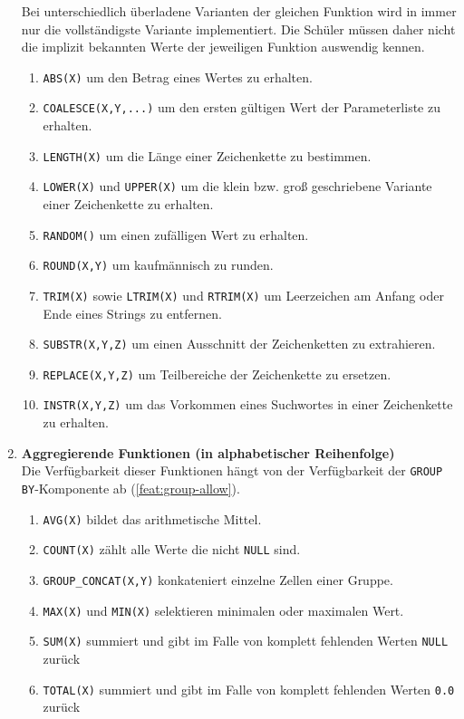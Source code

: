 \begin{enumerate}[resume]
  Bei unterschiedlich überladene Varianten der gleichen Funktion wird in \idename{} immer nur die vollständigste Variante implementiert. Die Schüler müssen daher nicht die implizit bekannten Werte der jeweiligen Funktion auswendig kennen.
  \begin{enumerate}[noitemsep]
  \item \label{feat:fun-abs} \texttt{ABS(X)} um den Betrag eines Wertes zu erhalten.
  \item \label{feat:fun-coalesce} \texttt{COALESCE(X,Y,...)} um den ersten gültigen Wert der Parameterliste zu erhalten.
  \item \label{feat:fun-length} \texttt{LENGTH(X)} um die Länge einer Zeichenkette zu bestimmen.
  \item \label{feat:fun-casing} \texttt{LOWER(X)} und \texttt{UPPER(X)} um die klein bzw. groß geschriebene Variante einer Zeichenkette zu erhalten.
  \item \label{feat:fun-random} \texttt{RANDOM()} um einen zufälligen Wert zu erhalten.
  \item \label{feat:fun-round} \texttt{ROUND(X,Y)} um kaufmännisch zu runden.
  \item \label{feat:fun-trim} \texttt{TRIM(X)} sowie \texttt{LTRIM(X)} und \texttt{RTRIM(X)} um Leerzeichen am Anfang oder Ende eines Strings zu entfernen.
  \item \label{feat:fun-substr} \texttt{SUBSTR(X,Y,Z)} um einen Ausschnitt der Zeichenketten zu extrahieren.
  \item \label{feat:fun-replace} \texttt{REPLACE(X,Y,Z)} um Teilbereiche der Zeichenkette zu ersetzen.
  \item \label{feat:fun-instr} \texttt{INSTR(X,Y,Z)} um das Vorkommen eines Suchwortes in einer Zeichenkette zu erhalten.
  \end{enumerate}

\item \textbf{Aggregierende Funktionen (in alphabetischer Reihenfolge)} \\
  Die Verfügbarkeit dieser Funktionen hängt von der Verfügbarkeit der \texttt{GROUP BY}-Komponente ab (\ref{feat:group-allow}).
  \begin{enumerate}[noitemsep]
  \item \label{feat:fun-avg} \texttt{AVG(X)} bildet das arithmetische Mittel.
  \item \label{feat:fun-count} \texttt{COUNT(X)} zählt alle Werte die nicht \lstinline{NULL} sind.
  \item \label{feat:fun-group-concat} \texttt{GROUP\_CONCAT(X,Y)} konkateniert einzelne Zellen einer Gruppe.
  \item \label{feat:fun-max-min} \texttt{MAX(X)} und \texttt{MIN(X)} selektieren minimalen oder maximalen Wert.
  \item \label{feat:fun-sum} \texttt{SUM(X)} summiert und gibt im Falle von komplett fehlenden Werten \texttt{NULL} zurück
  \item \label{feat:fun-total} \texttt{TOTAL(X)} summiert und gibt im Falle von komplett fehlenden Werten \texttt{0.0} zurück
  \end{enumerate}
\end{enumerate}

